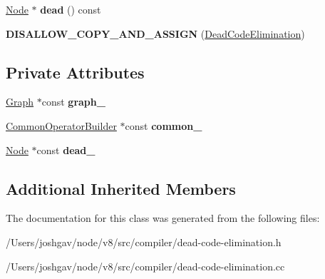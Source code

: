 \begin{DoxyCompactItemize}
\item 
\hyperlink{classv8_1_1internal_1_1compiler_1_1_node}{Node} $\ast$ {\bfseries dead} () const \hypertarget{classv8_1_1internal_1_1compiler_1_1_dead_code_elimination_a661fae219748dbdadd30ad31835b5a00}{}\label{classv8_1_1internal_1_1compiler_1_1_dead_code_elimination_a661fae219748dbdadd30ad31835b5a00}

\item 
{\bfseries D\+I\+S\+A\+L\+L\+O\+W\+\_\+\+C\+O\+P\+Y\+\_\+\+A\+N\+D\+\_\+\+A\+S\+S\+I\+GN} (\hyperlink{classv8_1_1internal_1_1compiler_1_1_dead_code_elimination}{Dead\+Code\+Elimination})\hypertarget{classv8_1_1internal_1_1compiler_1_1_dead_code_elimination_a827554ee5366039f27fddf1545035fe2}{}\label{classv8_1_1internal_1_1compiler_1_1_dead_code_elimination_a827554ee5366039f27fddf1545035fe2}

\end{DoxyCompactItemize}
\subsection*{Private Attributes}
\begin{DoxyCompactItemize}
\item 
\hyperlink{classv8_1_1internal_1_1compiler_1_1_graph}{Graph} $\ast$const {\bfseries graph\+\_\+}\hypertarget{classv8_1_1internal_1_1compiler_1_1_dead_code_elimination_ac719db2a8e9ebb73288959467e6b801c}{}\label{classv8_1_1internal_1_1compiler_1_1_dead_code_elimination_ac719db2a8e9ebb73288959467e6b801c}

\item 
\hyperlink{classv8_1_1internal_1_1compiler_1_1_common_operator_builder}{Common\+Operator\+Builder} $\ast$const {\bfseries common\+\_\+}\hypertarget{classv8_1_1internal_1_1compiler_1_1_dead_code_elimination_a57ff77087d9fe14fcd941dbb683d5edd}{}\label{classv8_1_1internal_1_1compiler_1_1_dead_code_elimination_a57ff77087d9fe14fcd941dbb683d5edd}

\item 
\hyperlink{classv8_1_1internal_1_1compiler_1_1_node}{Node} $\ast$const {\bfseries dead\+\_\+}\hypertarget{classv8_1_1internal_1_1compiler_1_1_dead_code_elimination_ac5ec0b4b496b64675d1d9d5eb97617f7}{}\label{classv8_1_1internal_1_1compiler_1_1_dead_code_elimination_ac5ec0b4b496b64675d1d9d5eb97617f7}

\end{DoxyCompactItemize}
\subsection*{Additional Inherited Members}


The documentation for this class was generated from the following files\+:\begin{DoxyCompactItemize}
\item 
/\+Users/joshgav/node/v8/src/compiler/dead-\/code-\/elimination.\+h\item 
/\+Users/joshgav/node/v8/src/compiler/dead-\/code-\/elimination.\+cc\end{DoxyCompactItemize}
